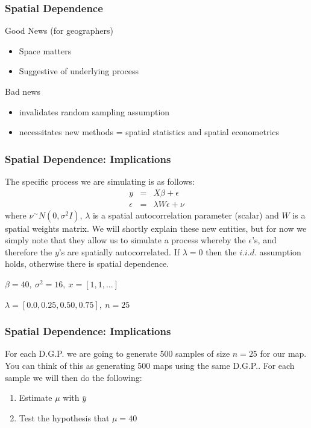 \documentclass[nototal]{beamer}
\begin{document}
\begin{frame}
    \frametitle{Spatial Dependence}
    \begin{block}{Good News (for geographers)}
      \begin{itemize}
        \item Space matters
        \item Suggestive of underlying process
      \end{itemize}
    \end{block}
    \begin{block}{Bad news}
      \begin{itemize}
        \item invalidates random sampling assumption
        \item necessitates new methods = spatial statistics and spatial
          econometrics
      \end{itemize}

    \end{block}
\end{frame}

\begin{frame}
    \frametitle{Spatial Dependence: Implications}

The specific process we are simulating is as follows:\begin{eqnarray}\label{eq:simdgp}y&=&X\beta + \epsilon \\ \nonumber\epsilon &=& \lambda W \epsilon + \nu  \end{eqnarray}
where $\nu^{\sim}N(0,\sigma^{2}I)$, $\lambda$ is a spatial autocorrelation parameter (scalar) and $W$
is a spatial weights matrix. We will shortly explain these new entities,
but for now we simply note that they allow us to simulate a process
whereby the $\epsilon$'s, and therefore the $y$'s are spatially
autocorrelated. If $\lambda=0$ then the $i.i.d.$ assumption holds,
otherwise there is spatial dependence.

$\beta=40, \ \sigma^2=16, \ x=[1,1,\ldots]$

$\lambda=[0.0, 0.25, 0.50, 0.75], \ n=25$
\end{frame}

\begin{frame}
    \frametitle{Spatial Dependence: Implications}


For each D.G.P. we are going to generate 500 samples of size $n=25$ for
our map. You can think of this as generating 500 maps using the same
D.G.P.. For each sample we will then do the following:
\begin{enumerate}
        \item Estimate $\mu$ with $\bar{y}$
        \item Test the hypothesis that $\mu=40$
\end{enumerate}

\end{frame}
\end{document}
